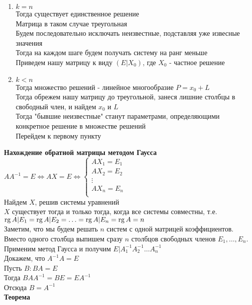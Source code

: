 \documentclass[12pt]{article}
\begin{document}
\begin{enumerate}
    \item $k = n$\\
    Тогда существует единственное решение\\
    Матрица в таком случае треугольная\\
    Будем последовательно исключать неизвестные, подставляя уже извесные значения\\
    Тогда на каждом шаге будем получать систему на ранг меньше\\
    Приведем нашу матрицу к виду $(E|X_0)$, где $X_0$ - частное решение
    \item $k < n$\\
    Тогда множество решений - линейное многообразие $P = x_0 + L$\\
    Тогда обрежем нашу матрицу до треугольной, занеся лишние столбцы в свободный член, и найдем $x_0$ и $L$\\
    Тогда "бывшие неизвестные" станут параметрами, определяющими конкретное решение в множестве решений\\
    Перейдем к первому пункту\\
\end{enumerate}
\textbf{Нахождение обратной матрицы методом Гаусса}\\
$AA^{-1}=E \Leftrightarrow AX = E \Leftrightarrow \left\{\begin{array}{l}
     AX_1 = E_1 \\
     AX_2 = E_2 \\
     \vdots\\
     AX_n = E_n\\
\end{array}\right.$\\
Найдем $X$, решив системы уравнений\\
$X$ существует тогда и только тогда, когда все системы совместны, т.е. $\operatorname{rg} A|E_1 = \operatorname{rg} A|E_2 = \ldots = \operatorname{rg} A|E_n = \operatorname{rg} A = n$\\
Заметим, что мы будем решать $n$ систем с одной матрицей коэффициентов. Вместо одного столбца выпишем сразу $n$ столбцов свободных членов $E_1,\ldots,E_n$. Применим метод Гаусса и получим $E|A^{-1}_1A^{-1}_2\ldots A^{-1}_n$\\
Докажем, что $A^{-1}A = E$\\
Пусть $B: BA=E$\\
Тогда $BAA^{-1}=BE=EA^{-1}$\\
Отсюда $B=A^{-1}$\\
\textbf{Теорема}\\
\end{document}
